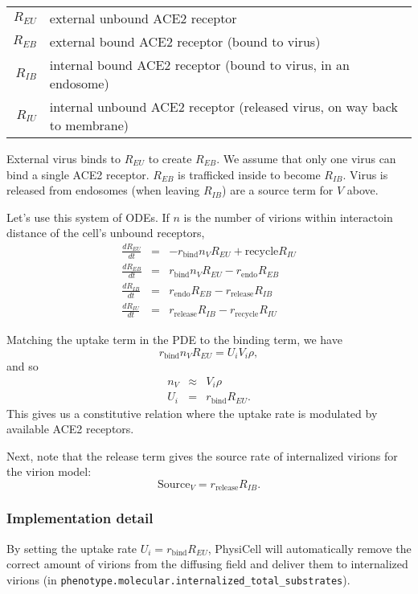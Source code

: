 \documentclass[12point]{article}
\begin{document}
\begin{centering}
\begin{tabular}{rl}
$R_{EU}$ & external unbound ACE2 receptor \\
$R_{EB}$ & external bound ACE2 receptor (bound to virus) \\
$R_{IB}$ & internal bound ACE2 receptor (bound to virus, in an endosome) \\
$R_{IU}$ & internal unbound ACE2 receptor (released virus, on way back to membrane)
\end{tabular}
\end{centering}

External virus binds to $R_{EU}$ to create $R_{EB}$. We assume that only one virus can bind a single ACE2 receptor. 
$R_{EB}$ is trafficked inside to become $R_{IB}$. Virus is released from endosomes (when leaving $R_{IB}$) are a 
source term for $V$ above. 

Let's use this system of ODEs. If $n$ is the number of virions within interactoin distance of the 
cell's unbound receptors, 
\begin{eqnarray}
\frac{d R_{EU}}{dt} & = &  - r_\textrm{bind} n_V R_{EU} + \textrm{recycle} R_{IU} \\
\frac{d R_{EB}}{dt} & = &   r_\textrm{bind} n_V R_{EU} - r_\textrm{endo} R_{EB}  \\
\frac{d R_{IB}}{dt} & = &   r_\textrm{endo} R_{EB} - r_\textrm{release} R_{IB} \\
\frac{d R_{IU}}{dt} & = & r_\textrm{release} R_{IB} - r_\textrm{recycle} R_{IU} 
\end{eqnarray}

Matching the uptake term in the PDE to the binding term, we have 
\begin{equation}
r_\textrm{bind} n_V R_{EU} = U_i V_i \rho , 
\end{equation} 
and so 
\begin{eqnarray}
n_V & \approx & V_i \rho \\ 
U_i & = & r_\textrm{bind} R_{EU}. 
\end{eqnarray}
This gives us a constitutive relation where the uptake rate is modulated by available ACE2 receptors. 

Next, note that the release term gives the source rate of internalized virions for the virion model: 
\begin{equation}
\textrm{Source}_V  = r_\textrm{release} R_{IB} .
\end{equation}

\subsubsection{Implementation detail}
By setting the uptake rate $U_i = r_\textrm{bind} R_{EU}$, PhysiCell will automatically 
remove the correct amount of virions from the diffusing field and deliver them to 
internalized virions (in \verb|phenotype.molecular.internalized_total_substrates|). 
\end{document}
